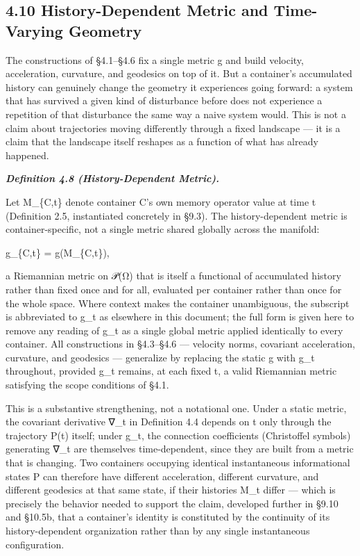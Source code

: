\documentclass[
]{article}
\begin{document}
\hypertarget{history-dependent-metric-and-time-varying-geometry}{%
\subsection{4.10 History-Dependent Metric and Time-Varying
Geometry}\label{history-dependent-metric-and-time-varying-geometry}}

The constructions of §4.1--§4.6 fix a single metric g and build
velocity, acceleration, curvature, and geodesics on top of it. But a
container's accumulated history can genuinely change the geometry it
experiences going forward: a system that has survived a given kind of
disturbance before does not experience a repetition of that disturbance
the same way a naive system would. This is not a claim about
trajectories moving differently through a fixed landscape --- it is a
claim that the landscape itself reshapes as a function of what has
already happened.

\emph{\textbf{Definition 4.8 (History-Dependent Metric).}}

Let M\_\{C,t\} denote container C's own memory operator value at time t
(Definition 2.5, instantiated concretely in §9.3). The history-dependent
metric is container-specific, not a single metric shared globally across
the manifold:

g\_\{C,t\} = g(M\_\{C,t\}),

a Riemannian metric on 𝒫(Ω) that is itself a functional of accumulated
history rather than fixed once and for all, evaluated per container
rather than once for the whole space. Where context makes the container
unambiguous, the subscript is abbreviated to g\_t as elsewhere in this
document; the full form is given here to remove any reading of g\_t as a
single global metric applied identically to every container. All
constructions in §4.3--§4.6 --- velocity norms, covariant acceleration,
curvature, and geodesics --- generalize by replacing the static g with
g\_t throughout, provided g\_t remains, at each fixed t, a valid
Riemannian metric satisfying the scope conditions of §4.1.

This is a substantive strengthening, not a notational one. Under a
static metric, the covariant derivative ∇\_t in Definition 4.4 depends
on t only through the trajectory P(t) itself; under g\_t, the connection
coefficients (Christoffel symbols) generating ∇\_t are themselves
time-dependent, since they are built from a metric that is changing. Two
containers occupying identical instantaneous informational states P can
therefore have different acceleration, different curvature, and
different geodesics at that same state, if their histories M\_t differ
--- which is precisely the behavior needed to support the claim,
developed further in §9.10 and §10.5b, that a container's identity is
constituted by the continuity of its history-dependent organization
rather than by any single instantaneous configuration.
\end{document}
